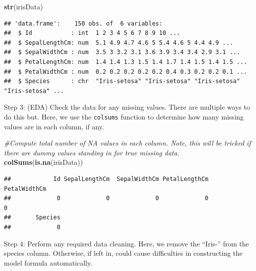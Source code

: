 \documentclass[
]{article}
\newenvironment{Shaded}{\begin{snugshade}}{\end{snugshade}}
\newcommand{\CommentTok}[1]{\textcolor[rgb]{0.56,0.35,0.01}{\textit{#1}}}
\newcommand{\FunctionTok}[1]{\textcolor[rgb]{0.13,0.29,0.53}{\textbf{#1}}}
\newcommand{\NormalTok}[1]{#1}
\newcommand{\OtherTok}[1]{\textcolor[rgb]{0.56,0.35,0.01}{#1}}
\newcommand{\SpecialCharTok}[1]{\textcolor[rgb]{0.81,0.36,0.00}{\textbf{#1}}}
\newcommand{\StringTok}[1]{\textcolor[rgb]{0.31,0.60,0.02}{#1}}
\begin{document}
\begin{Shaded}
\begin{Highlighting}[]
\FunctionTok{str}\NormalTok{(irisData)}
\end{Highlighting}
\end{Shaded}

\begin{verbatim}
## 'data.frame':    150 obs. of  6 variables:
##  $ Id           : int  1 2 3 4 5 6 7 8 9 10 ...
##  $ SepalLengthCm: num  5.1 4.9 4.7 4.6 5 5.4 4.6 5 4.4 4.9 ...
##  $ SepalWidthCm : num  3.5 3 3.2 3.1 3.6 3.9 3.4 3.4 2.9 3.1 ...
##  $ PetalLengthCm: num  1.4 1.4 1.3 1.5 1.4 1.7 1.4 1.5 1.4 1.5 ...
##  $ PetalWidthCm : num  0.2 0.2 0.2 0.2 0.2 0.4 0.3 0.2 0.2 0.1 ...
##  $ Species      : chr  "Iris-setosa" "Iris-setosa" "Iris-setosa" "Iris-setosa" ...
\end{verbatim}

Step 3: (EDA) Check the data for any missing values. There are multiple
ways to do this but. Here, we use the \texttt{colsums} function to
determine how many missing values are in each column, if any.

\begin{Shaded}
\begin{Highlighting}[]
\CommentTok{\#Compute total number of NA values in each column. Note, this  will be tricked if there are dummy values standing in for true missing data. }
\FunctionTok{colSums}\NormalTok{(}\FunctionTok{is.na}\NormalTok{(irisData))}
\end{Highlighting}
\end{Shaded}

\begin{verbatim}
##            Id SepalLengthCm  SepalWidthCm PetalLengthCm  PetalWidthCm 
##             0             0             0             0             0 
##       Species 
##             0
\end{verbatim}

Step 4: Perform any required data cleaning. Here, we remove the
``Iris-'' from the species column. Otherwise, if left in, could cause
difficulties in constructing the model formula automatically.

\begin{Shaded}
\end{Shaded}
\end{document}
